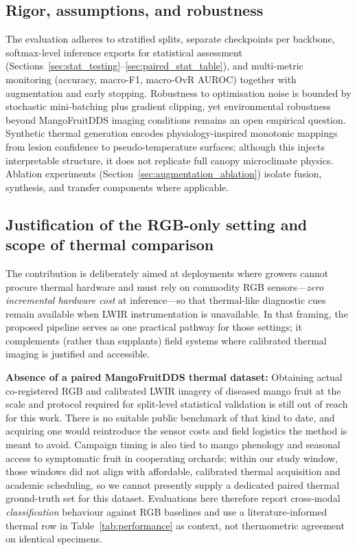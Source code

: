 \documentclass[utf8]{FrontiersinHarvard} %
\begin{document}
\subsection{Rigor, assumptions, and robustness}
The evaluation adheres to stratified splits, separate checkpoints per backbone, softmax-level inference exports for statistical assessment (Sections~\ref{sec:stat_testing}--\ref{sec:paired_stat_table}), and multi-metric monitoring (accuracy, macro-F1, macro-OvR AUROC) together with augmentation and early stopping. Robustness to optimisation noise is bounded by stochastic mini-batching plus gradient clipping, yet environmental robustness beyond MangoFruitDDS imaging conditions remains an open empirical question. Synthetic thermal generation encodes physiology-inspired monotonic mappings from lesion confidence to pseudo-temperature surfaces; although this injects interpretable structure, it does not replicate full canopy microclimate physics. Ablation experiments (Section~\ref{sec:augmentation_ablation}) isolate fusion, synthesis, and transfer components where applicable.

\subsection{Justification of the RGB-only setting and scope of thermal comparison}
\label{sec:thermal_scope_justification}
The contribution is deliberately aimed at deployments where growers cannot procure thermal hardware and must rely on commodity RGB sensors---\textit{zero incremental hardware cost} at inference---so that thermal-like diagnostic cues remain available when LWIR instrumentation is unavailable. In that framing, the proposed pipeline serves as one practical pathway for those settings; it complements (rather than supplants) field systems where calibrated thermal imaging is justified and accessible.

\textbf{Absence of a paired MangoFruitDDS thermal dataset:} Obtaining actual co-registered RGB and calibrated LWIR imagery of diseased mango fruit at the scale and protocol required for split-level statistical validation is still out of reach for this work. There is no suitable public benchmark of that kind to date, and acquiring one would reintroduce the sensor costs and field logistics the method is meant to avoid. Campaign timing is also tied to mango phenology and seasonal access to symptomatic fruit in cooperating orchards; within our study window, those windows did not align with affordable, calibrated thermal acquisition and academic scheduling, so we cannot presently supply a dedicated paired thermal ground-truth set for this dataset. Evaluations here therefore report cross-modal \emph{classification} behaviour against RGB baselines and use a literature-informed thermal row in Table~\ref{tab:performance} as context, not thermometric agreement on identical specimens.
\end{document}
